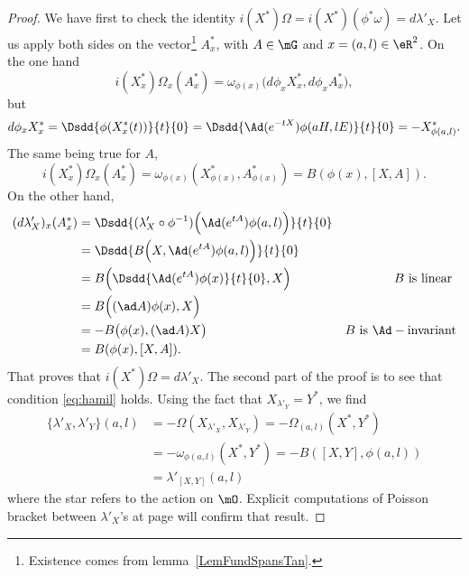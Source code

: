 \begin{proof}
	We have first to check the identity $i(X^*)\Omega=i(X^*)(\phi^*\omega)=d\lambda'_X$. Let us apply both sides on the vector\footnote{Existence comes from lemma~\ref{LemFundSpansTan}.} $A^*_x$, with $A\in\mG$ and $x=(a,l)\in\eR^2$. On the one hand
	\[
		i(X^*_x)\Omega_x(A^*_x)=\omega_{\phi(x)}\big(   d\phi_xX^*_x,d\phi_xA^*_x   \big),
	\]
	but
	\begin{equation}
		d\phi_xX^*_x=\Dsdd{\phi(X^*_x(t))}{t}{0}
		=\Dsdd{ \Ad(e^{-tX})\phi(aH,lE) }{t}{0}
		=-X^*_{\phi(a,l)}.
	\end{equation}
	The same being true for $A$,
	\[
		i(X^*_x)\Omega_x(A^*_x)=\omega_{\phi(x)}(X^*_{\phi(x)},A^*_{\phi(x)})=B(\phi(x),[X,A]).
	\]
	On the other hand,
	\begin{equation}
		\begin{aligned}
			(d\lambda'_X)_x(A^*_x) & =\Dsdd{ (\lambda'_X\circ\phi^{-1})\Big(   \Ad(e^{tA})\phi(a,l)   \Big) }{t}{0}                                    \\
			                       & =\Dsdd{  B\Big(X,\Ad(e^{tA})\phi(a,l) \Big)  }{t}{0}                                                              \\
			                       & =B\Big(  \Dsdd{\Ad(e^{tA})\phi(x)}{t}{0},X   \Big)                             & B\text{ is linear }              \\
			                       & =B\Big(  (\ad A)\phi(x),X   \Big)                                                                                 \\
			                       & =-B\big(\phi(x),(\ad A)X\big)                                                  & B\text{ is }\Ad-\text{invariant} \\
			                       & =B(\phi(x),[X,A]).
		\end{aligned}
	\end{equation}
	That proves that $i(X^*)\Omega=d\lambda'_X$.  The second part of the proof is to see that condition \eqref{eq:hamil} holds.  Using the fact that $X_{\lambda'_Y}=Y^*$, we find
	\[
		\begin{split}
			\{ \lambda'_X,\lambda'_Y \}(a,l)&=-\Omega(X_{\lambda'_X},X_{\lambda'_Y})
			=-\Omega_{(a,l)}(X^*,Y^*)\\
			&=-\omega_{\phi(a,l)}(X^*,Y^*)
			=-B([X,Y],\phi(a,l))\\
			&=\lambda'_{[X,Y]}(a,l)
		\end{split}
	\]
	where the star refers to the action on $\mO$. Explicit computations of Poisson bracket between $\lambda'_X$'s at page \pageref{pg:explic_com_lamb} will confirm that result.

\end{proof}

